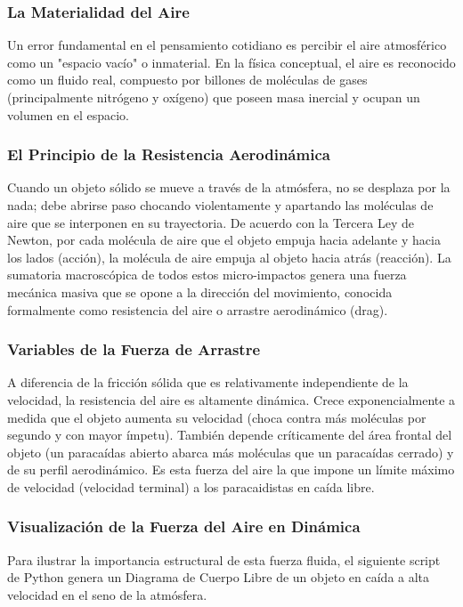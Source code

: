 \documentclass[12pt]{article}
\begin{document}
\subsubsection*{La Materialidad del Aire}
Un error fundamental en el pensamiento cotidiano es percibir el aire atmosférico como un "espacio vacío" o inmaterial. En la física conceptual, el aire es reconocido como un fluido real, compuesto por billones de moléculas de gases (principalmente nitrógeno y oxígeno) que poseen masa inercial y ocupan un volumen en el espacio.

\subsubsection*{El Principio de la Resistencia Aerodinámica}
Cuando un objeto sólido se mueve a través de la atmósfera, no se desplaza por la nada; debe abrirse paso chocando violentamente y apartando las moléculas de aire que se interponen en su trayectoria. De acuerdo con la Tercera Ley de Newton, por cada molécula de aire que el objeto empuja hacia adelante y hacia los lados (acción), la molécula de aire empuja al objeto hacia atrás (reacción). 
La sumatoria macroscópica de todos estos micro-impactos genera una fuerza mecánica masiva que se opone a la dirección del movimiento, conocida formalmente como resistencia del aire o arrastre aerodinámico (drag).

\subsubsection*{Variables de la Fuerza de Arrastre}
A diferencia de la fricción sólida que es relativamente independiente de la velocidad, la resistencia del aire es altamente dinámica. Crece exponencialmente a medida que el objeto aumenta su velocidad (choca contra más moléculas por segundo y con mayor ímpetu). También depende críticamente del área frontal del objeto (un paracaídas abierto abarca más moléculas que un paracaídas cerrado) y de su perfil aerodinámico. Es esta fuerza del aire la que impone un límite máximo de velocidad (velocidad terminal) a los paracaidistas en caída libre.

\subsubsection*{Visualización de la Fuerza del Aire en Dinámica}
Para ilustrar la importancia estructural de esta fuerza fluida, el siguiente script de Python genera un Diagrama de Cuerpo Libre de un objeto en caída a alta velocidad en el seno de la atmósfera.
\end{document}
